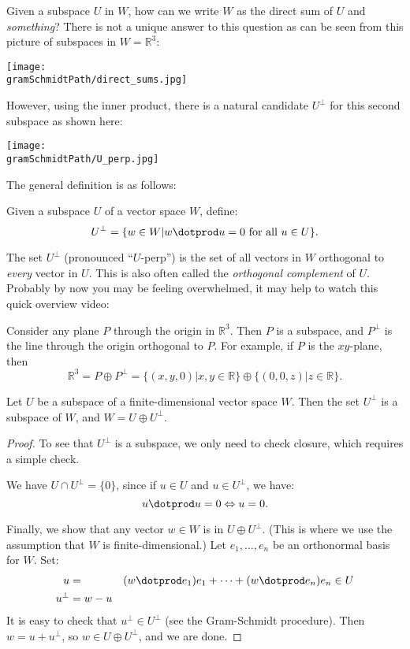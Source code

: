 Given a subspace $U$ in $W$, how can we write $W$ as the direct sum of $U$ and \emph{something}? There is not a unique answer to this question as can be seen from this picture of subspaces in $W={\mathbb R}^3$: 
\begin{center}
\texttt{[image: \\gramSchmidtPath/direct\_sums.jpg]}
\end{center}
However, using the inner product, there is a natural candidate $U^\perp$ for this second subspace as shown here:
\begin{center}
\texttt{[image: \\gramSchmidtPath/U\_perp.jpg]}
\end{center}

The general definition is as follows:
\begin{definition}
Given a subspace $U$ of a vector space $W$, define:
\[
U^\perp = \{w\in W | w\dotprod u=0 \text{ for all } u\in U\}.
\]
\end{definition}

The set $U^\perp$ (pronounced ``$U$-perp'') is the set of all vectors in $W$ orthogonal to \emph{every} vector in $U$.  This is also often called the \emph{orthogonal complement} of $U$. Probably by now you may be feeling overwhelmed, it may help to watch this quick overview video:




\begin{example}
Consider any plane $P$ through the origin in $\mathbb{R}^3$.  Then $P$ is a subspace, and $P^\perp$ is the line through the origin orthogonal to $P$.  For example, if $P$ is the $xy$-plane, then
\[
\mathbb{R}^3=P\oplus P^\perp=\{(x,y,0)| x,y\in \mathbb{R} \} \oplus \{(0,0,z)| z\in \mathbb{R} \}.
\]
\end{example}

\begin{theorem}
Let $U$ be a subspace of a finite-dimensional vector space $W$.  Then the set $U^\perp$ is a subspace of $W$, and $W=U\oplus U^\perp$.
\end{theorem}

\begin{proof}
To see that $U^\perp$ is a subspace, we only need to check closure, which requires a simple check.

We have $U\cap U^\perp=\{0\}$, since if $u\in U$ and $u\in U^\perp$, we have:
\[
u\dotprod u = 0 \Leftrightarrow u=0.
\]

Finally, we show that any vector $w\in W$ is in $U\oplus U^\perp$.  (This is where we use the assumption that $W$ is finite-dimensional.)  Let $e_1, \ldots, e_n$ be an orthonormal basis for $W$.  Set: 
\begin{align*}
u&=&(w\dotprod e_1)e_1 + \cdots + (w\dotprod e_n)e_n \in U\\
u^\perp&= w-u
\end{align*}
It is easy to check that $u^\perp \in U^\perp$ (see the Gram-Schmidt procedure).  Then $w=u+u^\perp$, so $w\in U\oplus U^\perp$, and we are done.
\end{proof}


